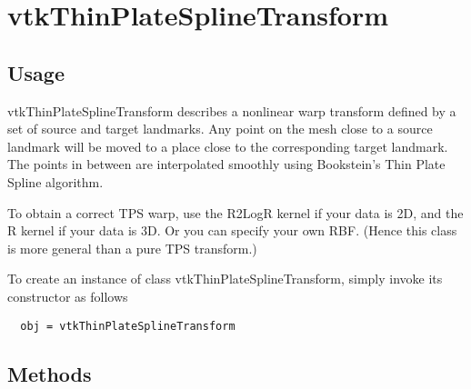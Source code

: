 \section{vtkThinPlateSplineTransform}

\subsection{Usage}

 vtkThinPlateSplineTransform describes a nonlinear warp transform defined
 by a set of source and target landmarks. Any point on the mesh close to a
 source landmark will be moved to a place close to the corresponding target
 landmark. The points in between are interpolated smoothly using
 Bookstein's Thin Plate Spline algorithm.

 To obtain a correct TPS warp, use the R2LogR kernel if your data is 2D, and
 the R kernel if your data is 3D. Or you can specify your own RBF. (Hence this
 class is more general than a pure TPS transform.) 

To create an instance of class vtkThinPlateSplineTransform, simply
invoke its constructor as follows
\begin{verbatim}
  obj = vtkThinPlateSplineTransform
\end{verbatim}
\subsection{Methods}

